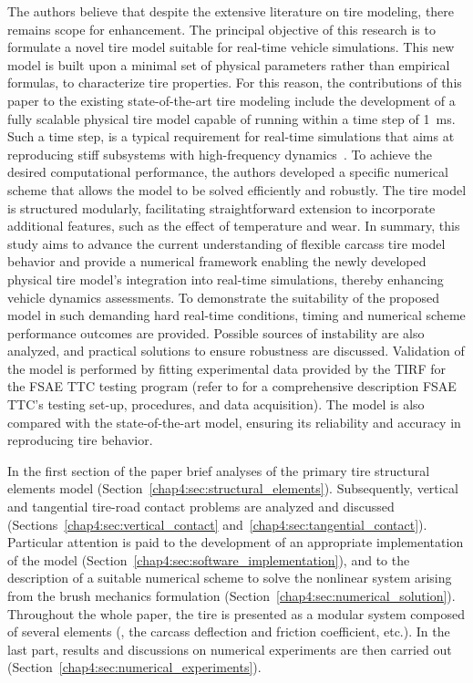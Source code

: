 The authors believe that despite the extensive literature on tire modeling, there remains scope for enhancement. The principal objective of this research is to formulate a novel tire model suitable for real-time vehicle simulations. This new model is built upon a minimal set of physical parameters rather than empirical formulas, to characterize tire properties. For this reason, the contributions of this paper to the existing state-of-the-art tire modeling include the development of a fully scalable physical tire model capable of running within a time step of \SI{1}{\milli\second}. Such a time step, is a typical requirement for real-time simulations that aims at reproducing stiff subsystems with high-frequency dynamics~\cite{pacejka2012tire}. To achieve the desired computational performance, the authors developed a specific numerical scheme that allows the model to be solved efficiently and robustly. The tire model is structured modularly, facilitating straightforward extension to incorporate additional features, such as the effect of temperature and wear. In summary, this study aims to advance the current understanding of flexible carcass tire model behavior and provide a numerical framework enabling the newly developed physical tire model's integration into real-time simulations, thereby enhancing vehicle dynamics assessments. To demonstrate the suitability of the proposed model in such demanding hard real-time conditions, timing and numerical scheme performance outcomes are provided. Possible sources of instability are also analyzed, and practical solutions to ensure robustness are discussed. Validation of the model is performed by fitting experimental data provided by the \ac{TIRF} for the \ac{FSAE TTC} testing program (refer to \citet{kasprzak2006formula} for a comprehensive description \ac{FSAE TTC}'s testing set-up, procedures, and data acquisition). The model is also compared with the state-of-the-art \MagicFormulae{} model, ensuring its reliability and accuracy in reproducing tire behavior.

In the first section of the paper brief analyses of the primary tire structural elements model (Section~\ref{chap4:sec:structural_elements}). Subsequently, vertical and tangential tire-road contact problems are analyzed and discussed (Sections~\ref{chap4:sec:vertical_contact} and~\ref{chap4:sec:tangential_contact}). Particular attention is paid to the development of an appropriate implementation of the model (Section~\ref{chap4:sec:software_implementation}), and to the description of a suitable numerical scheme to solve the nonlinear system arising from the brush mechanics formulation (Section~\ref{chap4:sec:numerical_solution}). Throughout the whole paper, the tire is presented as a modular system composed of several elements (\eg{}, the carcass deflection and friction coefficient, etc.). In the last part, results and discussions on numerical experiments are then carried out (Section~\ref{chap4:sec:numerical_experiments}).

